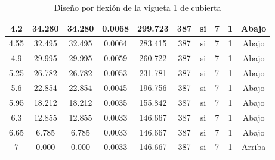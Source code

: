 \begin{table}[H]
{\begin{tabular}{|c|c|c|c|c|c|c|c|c|c|}
    \hline
    4.2 & 34.280 & 34.280 & 0.0068 & 299.723 & 387 & si  & 7   & 1   & Abajo \bigstrut\\
    \hline
    4.55 & 32.495 & 32.495 & 0.0064 & 283.415 & 387 & si  & 7   & 1   & Abajo \bigstrut\\
    \hline
    4.9 & 29.995 & 29.995 & 0.0059 & 260.722 & 387 & si  & 7   & 1   & Abajo \bigstrut\\
    \hline
    5.25 & 26.782 & 26.782 & 0.0053 & 231.781 & 387 & si  & 7   & 1   & Abajo \bigstrut\\
    \hline
    5.6 & 22.854 & 22.854 & 0.0045 & 196.756 & 387 & si  & 7   & 1   & Abajo \bigstrut\\
    \hline
    5.95 & 18.212 & 18.212 & 0.0035 & 155.842 & 387 & si  & 7   & 1   & Abajo \bigstrut\\
    \hline
    6.3 & 12.855 & 12.855 & 0.0033 & 146.667 & 387 & si  & 7   & 1   & Abajo \bigstrut\\
    \hline
    6.65 & 6.785 & 6.785 & 0.0033 & 146.667 & 387 & si  & 7   & 1   & Abajo \bigstrut\\
    \hline
    7   & 0.000 & 0.000 & 0.0033 & 146.667 & 387 & si  & 7   & 1   & Arriba \bigstrut\\
    \hline
    \end{tabular}%
   }%
      \caption{Diseño por flexión de la vigueta 1 de cubierta}
  \label{tab:F VT1 CUB}%
\end{table}%

